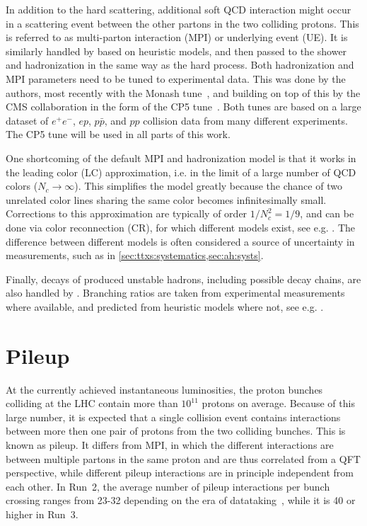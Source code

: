 In addition to the hard scattering, additional soft QCD interaction might occur in a scattering event between the other partons in the two colliding protons. This is referred to as multi-parton interaction (MPI) or underlying event (UE). It is similarly handled by \pythia based on heuristic models, and then passed to the shower and hadronization in the same way as the hard process. Both hadronization and MPI parameters need to be tuned to experimental data. This was done by the \pythia authors, most recently with the Monash tune~\cite{Skands:2014pea}, and building on top of this by the CMS collaboration in the form of the CP5 tune~\cite{CMS:GEN-17-001}. Both tunes are based on a large dataset of $e^+e^-$, $ep$, $p\bar{p}$, and $pp$ collision data from many different experiments. The CP5 tune will be used in all parts of this work.

One shortcoming of the default MPI and hadronization model is that it works in the leading color (LC) approximation, i.e. in the limit of a large number of QCD colors ($N_c \rightarrow \infty$). This simplifies the model greatly because the chance of two unrelated color lines sharing the same color becomes infinitesimally small. Corrections to this approximation are typically of order $1/N_c^2 = 1/9$, and can be done via color reconnection (CR), for which different models exist, see e.g. . The difference between different models is often considered a source of uncertainty in measurements, such as in \cref{sec:ttxs:systematics,sec:ah:systs}.

Finally, decays of produced unstable hadrons, including possible decay chains, are also handled by \pythia. Branching ratios are taken from experimental measurements where available, and predicted from heuristic models where not, see e.g. .

\section{Pileup}
\label{sec:mc:pileup}

At the currently achieved instantaneous luminosities, the proton bunches colliding at the LHC contain more than $10^{11}$ protons on average. Because of this large number, it is expected that a single collision event contains interactions between more then one pair of protons from the two colliding bunches. This is known as pileup. It differs from MPI, in which the different interactions are between multiple partons in the same proton and are thus correlated from a QFT perspective, while different pileup interactions are in principle independent from each other. In Run~2, the average number of pileup interactions per bunch crossing ranges from 23-32 depending on the era of datataking~\cite{CMS:2020ebo}, while it is 40 or higher in Run~3.

